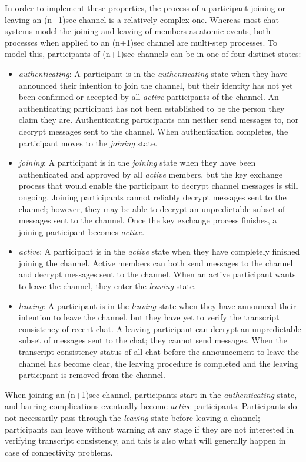 \documentclass{article}
\begin{document}
In order to implement these properties, the process of a participant joining or leaving an (n+1)sec channel is a relatively complex one.
Whereas most chat systems model the joining and leaving of members as atomic events, both processes when applied to an (n+1)sec channel are multi-step processes.
To model this, participants of (n+1)sec channels can be in one of four distinct states:
\begin{itemize}
\item \emph{authenticating}: A participant is in the \emph{authenticating} state when they have announced their intention to join the channel, but their identity has not yet been confirmed or accepted by all \emph{active} participants of the channel. An authenticating participant has not been established to be the person they claim they are. Authenticating participants can neither send messages to, nor decrypt messages sent to the channel. When authentication completes, the participant moves to the \emph{joining} state.
\item \emph{joining}: A participant is in the \emph{joining} state when they have been authenticated and approved by all \emph{active} members, but the key exchange process that would enable the participant to decrypt channel messages is still ongoing. Joining participants cannot reliably decrypt messages sent to the channel; however, they may be able to decrypt an unpredictable subset of messages sent to the channel. Once the key exchange process finishes, a joining participant becomes \emph{active}.
\item \emph{active}: A participant is in the \emph{active} state when they have completely finished joining the channel. Active members can both send messages to the channel and decrypt messages sent to the channel. When an active participant wants to leave the channel, they enter the \emph{leaving} state.
\item \emph{leaving}: A participant is in the \emph{leaving} state when they have announced their intention to leave the channel, but they have yet to verify the transcript consistency of recent chat. A leaving participant can decrypt an unpredictable subset of messages sent to the chat; they cannot send messages. When the transcript consistency status of all chat before the announcement to leave the channel has become clear, the leaving procedure is completed and the leaving participant is removed from the channel.
\end{itemize}
When joining an (n+1)sec channel, participants start in the \emph{authenticating} state, and barring complications eventually become \emph{active} participants.
Participants do not necessarily pass through the \emph{leaving} state before leaving a channel; participants can leave without warning at any stage if they are not interested in verifying transcript consistency, and this is also what will generally happen in case of connectivity problems.
\end{document}
